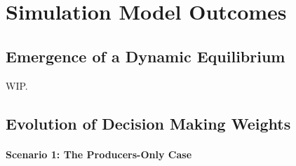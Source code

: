 \documentclass[11pt]{article}
\begin{document}
\section*{Simulation Model Outcomes}

\subsection*{Emergence of a Dynamic Equilibrium}

WIP.

\subsection*{Evolution of Decision Making Weights}

\paragraph{Scenario 1: The Producers-Only Case}

\end{document}
